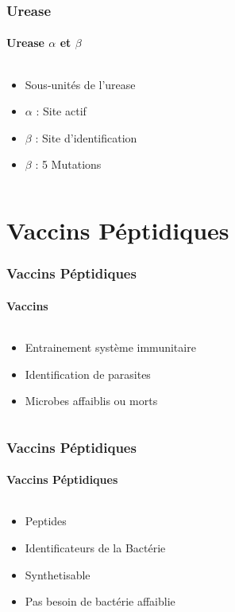 \documentclass[11pt, notes]{beamer}
\begin{document}
\begin{frame}
\frametitle{Urease}
\framesubtitle{Urease $\alpha$ et $\beta$}
\begin{columns}[c]
	\begin{column}[c]{5cm}
		\begin{itemize}[<+->]
			\item Sous-unités de l'urease
			\item $\alpha$ : Site actif
			\item $\beta$ : Site d'identification
			\item $\beta$ : 5 Mutations
		\end{itemize}
	\end{column}
	\begin{column}[c]{5cm}
	\end{column}
\end{columns}
\end{frame}

\section{Vaccins Péptidiques}
\begin{frame}
\frametitle{Vaccins Péptidiques}
\framesubtitle{Vaccins}
\begin{columns}[c]
	\begin{column}[c]{5cm}
		\begin{itemize}[<+->]
			\item Entrainement système immunitaire
			\item Identification de parasites
			\item Microbes affaiblis ou morts
		\end{itemize}
	\end{column}
	\begin{column}[c]{5cm}
	\end{column}
\end{columns}
\end{frame}

\begin{frame}
\frametitle{Vaccins Péptidiques}
\framesubtitle{Vaccins Péptidiques}
\begin{columns}[c]
	\begin{column}[c]{5cm}
		\begin{itemize}[<+->]
			\item Peptides
			\item Identificateurs de la Bactérie
			\item Synthetisable
			\item Pas besoin de bactérie affaiblie
		\end{itemize}
	\end{column}
	\begin{column}[c]{5cm}
	\end{column}
\end{columns}
\end{frame}
\end{document}
